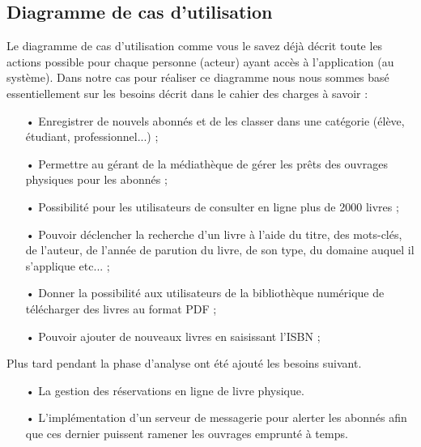 \documentclass[12pt,a4paper]{article}
\begin{document}
\subsection{Diagramme de cas d'utilisation}
Le diagramme de cas d'utilisation comme vous le savez déjà décrit toute les actions
possible pour chaque personne (acteur) ayant accès à l'application (au système). Dans 
notre cas pour réaliser ce diagramme nous nous sommes basé essentiellement sur les besoins décrit dans le cahier des charges à savoir : 
\begin{itemize} 
\item[•] Enregistrer de nouvels abonnés et de les classer dans une catégorie (élève, étudiant, professionnel...) ;
\item[•] Permettre au gérant de la médiathèque de gérer les prêts des ouvrages physiques pour les abonnés ;
\item[•] Possibilité pour les utilisateurs de consulter en ligne plus de 2000 livres ;
\item[•] Pouvoir déclencher la recherche d’un livre à l’aide du titre, des mots-clés, de l’auteur, de l’année
de parution du livre, de son type, du domaine auquel il s’applique etc... ;
\item[•] Donner la possibilité aux utilisateurs de la bibliothèque numérique de télécharger des livres au
format PDF ;
\item[•] Pouvoir ajouter de nouveaux livres en saisissant l’ISBN ;
\end{itemize}
Plus tard pendant la phase d'analyse ont été ajouté les besoins suivant.\\
\begin{itemize}
\item[•] La gestion des réservations en ligne de livre physique.
\item[•] L'implémentation d'un serveur de messagerie pour alerter les abonnés afin
que ces dernier puissent ramener les ouvrages emprunté à temps.
\end{itemize}
\end{document}
